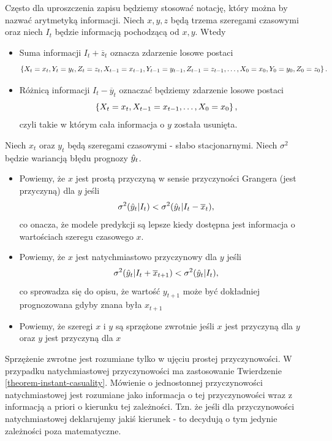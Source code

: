 \documentclass[10pt,a4paper]{book}
\begin{document}
\begin{definition}
Często dla uproszczenia zapisu będziemy stosować notację, który można by nazwać arytmetyką informacji. Niech $x,y,z$ będą trzema szeregami czasowymi oraz niech $I_t$ będzie informacją pochodzącą od $x,y$. Wtedy 
\begin{itemize}
\item Suma informacji $ I_t + \overline{z}_t$ oznacza zdarzenie losowe postaci
$$
\left\lbrace { X_t = x_t, Y_t = y_t, Z_t = z_t , X_{t-1} = x_{t-1}, Y_{t-1} = y_{t-1}, Z_{t-1} = z_{t-1}, \ldots , X_0 = x_0, Y_0 = y_0, Z_0 = z_0} \right\rbrace. 
$$
\item Różnicą informacji $ I_t - \overline{y}_t$ oznaczać będziemy zdarzenie losowe postaci
$$
\left\lbrace { X_t = x_t , X_{t-1} = x_{t-1} , \ldots , X_0 = x_0} \right\rbrace,
$$
czyli takie w którym cała informacja o $y$ została usunięta.
\end{itemize}
\end{definition}

\begin{definition}
Niech $x_t$ oraz $y_t$ będą szeregami czasowymi - słabo stacjonarnymi. Niech $\sigma^2$ będzie wariancją błędu prognozy $\predict{y}{t}$. 
\begin{itemize}
\item Powiemy, że $x$ jest prostą przyczyną w sensie przyczyności Grangera (jest przyczyną) dla $y$ jeśli 
$$
\sigma^2 ( \predict{y}{t} | I_t ) < \sigma^2 ( \predict{y}{t} | I_t - \overline{x}_t ), 
$$
co onacza, że modele predykcji są lepsze kiedy dostępna jest informacja o wartościach szeregu czasowego $x$.
\item Powiemy, że $x$ jest natychmiastowo przyczynowy dla $y$ jeśli
$$
\sigma^2 ( \predict{y}{t} | I_t + \overline{x}_{t+1} ) < \sigma^2 ( \predict{y}{t} | I_t ), 
$$  
co sprowadza się do opisu, że wartość $y_{t+1}$ może być dokładniej prognozowana gdyby znana była $x_{t+1}$
\item Powiemy, że szeregi $x$ i $y$ są sprzężone zwrotnie jeśli $x$ jest przyczyną dla $y$ oraz $y$ jest przyczyną dla $x$
\end{itemize} 
\end{definition}

\begin{remark}
Sprzężenie zwrotne jest rozumiane tylko w ujęciu prostej przyczynowości. W przypadku natychmiastowej przyczynowości ma zastosowanie Twierdzenie \ref{theorem-instant-casuality}. Mówienie o jednostonnej przyczynowości natychmiastowej jest rozumiane jako informacja o tej przyczynowości wraz z informacją a priori o kierunku tej zależności. Tzn. że jeśli dla przyczynowości natychmiastowej deklarujemy jakiś kierunek - to decydują o tym jedynie zależności poza matematyczne.
\end{remark}
\end{document}
